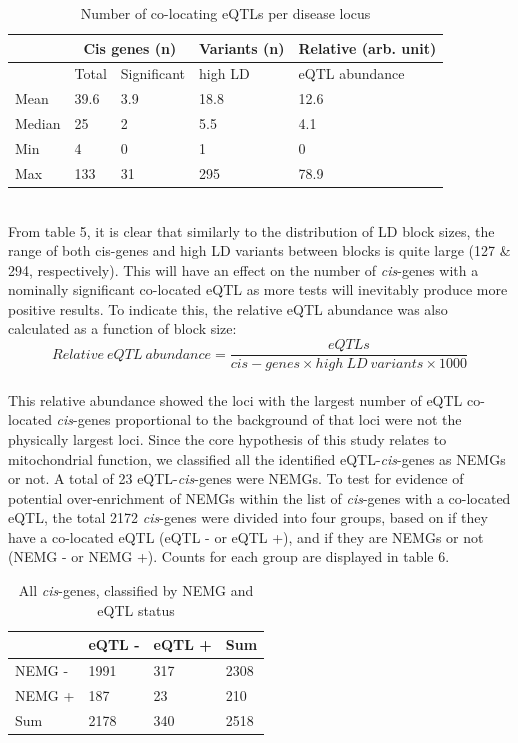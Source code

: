 \documentclass{article}
\begin{document}
\begin{table}[h]
\centering
\caption{Number of co-locating eQTLs per disease locus}
\label{tab:my-table}
\begin{tabular}{|l|ll|l|l|}
\hline
       & \multicolumn{2}{c|}{Cis genes (n)}       & Variants (n) & Relative (arb. unit) \\ \hline
       & \multicolumn{1}{l|}{Total} & Significant & high LD      & eQTL abundance       \\ \hline
Mean   & \multicolumn{1}{l|}{39.6}  & 3.9         & 18.8         & 12.6                 \\ \hline
Median & \multicolumn{1}{l|}{25}    & 2           & 5.5          & 4.1                  \\ \hline
Min    & \multicolumn{1}{l|}{4}     & 0           & 1            & 0                    \\ \hline
Max    & \multicolumn{1}{l|}{133}   & 31          & 295          & 78.9                 \\ \hline
\end{tabular}
\end{table}
\\From table 5, it is clear that similarly to the distribution of LD block sizes, the range of both cis-genes and high LD variants between blocks is quite large (127 \& 294, respectively). This will have an effect on the number of \textit{cis}-genes with a nominally significant co-located eQTL as more tests will inevitably produce more positive results. To indicate this, the relative eQTL abundance was also calculated as a function of block size:
\[ 
Relative\ eQTL\ abundance = \frac{eQTLs}{\textit{cis}-genes \times high\ LD\ variants \times 1000}
\]
\\This relative abundance showed the loci with the largest number of eQTL co-located \textit{cis}-genes proportional to the background of that loci were not the physically largest loci.
\label{fisher1}
Since the core hypothesis of this study relates to mitochondrial function, we classified all the identified eQTL-\textit{cis}-genes as NEMGs or not. A total of 23 eQTL-\textit{cis}-genes were NEMGs. To test for evidence of potential over-enrichment of NEMGs within the list of \textit{cis}-genes with a co-located eQTL, the total 2172 \textit{cis}-genes were divided into four groups, based on if they have a co-located eQTL (eQTL - or eQTL +), and if they are NEMGs or not (NEMG - or NEMG +). Counts for each group are displayed in table 6.
\begin{table}[h]
    \centering
    \caption{All \textit{cis}-genes, classified by NEMG and eQTL status}
    \begin{tabular}{|l|l|l|l|}
        \hline
               & eQTL - & eQTL + & Sum  \\ \hline
        NEMG - &  1991    &  317    & 2308  \\ \hline
        NEMG + & 187   &  23  &  210\\ \hline
        Sum    & 2178   & 340    & 2518 \\ \hline
    \end{tabular}
\end{table}
\end{document}
